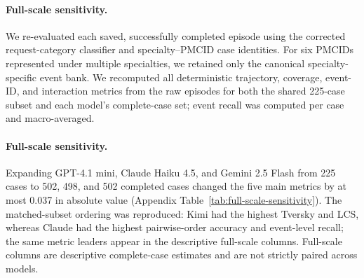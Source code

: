 \paragraph{Full-scale sensitivity.} We re-evaluated each saved, successfully completed episode using the corrected request-category classifier and specialty--PMCID case identities. For six PMCIDs represented under multiple specialties, we retained only the canonical specialty-specific event bank. We recomputed all deterministic trajectory, coverage, event-ID, and interaction metrics from the raw episodes for both the shared 225-case subset and each model's complete-case set; event recall was computed per case and macro-averaged.

\paragraph{Full-scale sensitivity.} Expanding GPT-4.1 mini, Claude Haiku 4.5, and Gemini 2.5 Flash from 225 cases to 502, 498, and 502 completed cases changed the five main metrics by at most 0.037 in absolute value (Appendix Table~\ref{tab:full-scale-sensitivity}). The matched-subset ordering was reproduced: Kimi had the highest Tversky and LCS, whereas Claude had the highest pairwise-order accuracy and event-level recall; the same metric leaders appear in the descriptive full-scale columns. Full-scale columns are descriptive complete-case estimates and are not strictly paired across models.
